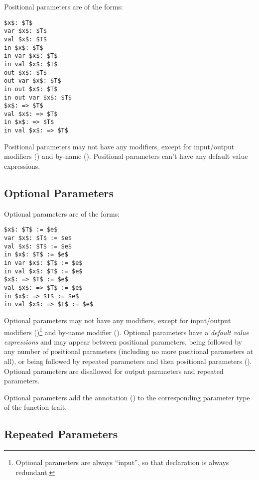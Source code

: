 Positional parameters are of the forms:
\begin{lstlisting}
$x$: $T$
var $x$: $T$
val $x$: $T$
in $x$: $T$
in var $x$: $T$
in val $x$: $T$
out $x$: $T$
out var $x$: $T$
in out $x$: $T$
in out var $x$: $T$
$x$: => $T$
val $x$: => $T$
in $x$: => $T$
in val $x$: => $T$
\end{lstlisting}

Positional parameters may not have any modifiers, except for input/output modifiers () and by-name (). Positional parameters can't have any default value expressions. 






\subsection{Optional Parameters}
\label{sec:optional-parameters}

Optional parameters are of the forms:
\begin{lstlisting}
$x$: $T$ := $e$
var $x$: $T$ := $e$
val $x$: $T$ := $e$
in $x$: $T$ := $e$
in var $x$: $T$ := $e$
in val $x$: $T$ := $e$
$x$: => $T$ := $e$
val $x$: => $T$ := $e$
in $x$: => $T$ := $e$
in val $x$: => $T$ := $e$
\end{lstlisting}

Optional parameters may not have any modifiers, except for input/output modifiers ()\footnote{Optional parameters are always ``input'', so that declaration is always redundant.} and by-name modifier (). Optional parameters have a {\em default value expressions} and may appear between positional parameters, being followed by any number of positional parameters (including no more positional parameters at all), or being followed by repeated parameters and then positional parameters (). Optional parameters are disallowed for output parameters and repeated parameters. 

Optional parameters add the annotation ()  to the corresponding parameter type of the function trait. 






\subsection{Repeated Parameters}
\label{sec:repeated-parameters}

